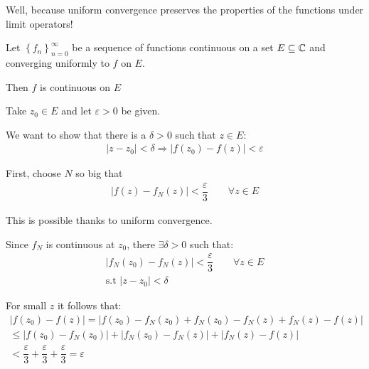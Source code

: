 \noindent Well, because uniform convergence preserves the properties of the functions under limit operators!
\par\bigskip
\begin{theo}[]{}
  Let $\left\{f_n\right\}_{n=0}^\infty$ be a sequence of functions continuous on a set $E\subseteq\mathbb{C}$ and converging uniformly to $f$ on $E$.
  \par\bigskip
  \noindent Then $f$ is continuous on $E$
\end{theo}
\par\bigskip
\begin{prf}[]{}
  Take $z_0\in E$ and let $\varepsilon>0$ be given.\par
  \noindent We want to show that there is a $\delta >0$ such that $z\in E$:
  \begin{equation*}
    \begin{gathered}
      \left|z-z_0\right|<\delta\Rightarrow \left|f(z_0)-f(z)\right|<\varepsilon
    \end{gathered}
  \end{equation*}
  \par\bigskip
  \noindent First, choose $N$ so big that
  \begin{equation*}
    \begin{gathered}
      \left|f(z)-f_N(z)\right|<\dfrac{\varepsilon}{3}\qquad\forall z\in E
    \end{gathered}
  \end{equation*}
  \par\bigskip
  \noindent This is possible thanks to uniform convergence.\par
  \noindent Since $f_N$ is continuous at $z_0$, there $\exists\delta>0$ such that:
  \begin{equation*}
    \begin{gathered}
      \left|f_N(z_0)-f_N(z)\right|<\dfrac{\varepsilon}{3}\qquad\forall z\in E\\
      \text{s.t } \left|z-z_0\right|<\delta
    \end{gathered}
  \end{equation*}
  \par\bigskip
  \noindent For small $z$ it follows that:
  \begin{equation*}
    \begin{gathered}
      \left|f(z_0)-f(z)\right| = \left|f(z_0)-f_N(z_0)+f_N(z_0)-f_N(z)+f_N(z)-f(z)\right|\\
      \leq \left|f(z_0)-f_N(z_0)\right|+\left|f_N(z_0)-f_N(z)\right|+\left|f_N(z)-f(z)\right|\\
      < \dfrac{\varepsilon}{3}+\dfrac{\varepsilon}{3}+\dfrac{\varepsilon}{3} = \varepsilon
    \end{gathered}
  \end{equation*}
\end{prf}

